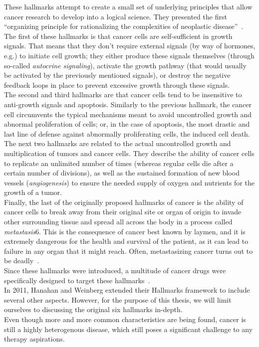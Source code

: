 These hallmarks attempt to create a small set of underlying principles that allow cancer research to develop into a logical science. They presented the first ``organizing principle for rationalizing the complexities of neoplastic disease''~\cite{hallmarks-of-cancer-next-generation}.\\
The first of these hallmarks is that cancer cells are self-sufficient in growth signals. That means that they don't require external signals (by way of hormones, e.g.) to initiate cell growth; they either produce these signals themselves (through so-called \textit{autocrine signaling}), activate the growth pathway (that would usually be activated by the previously mentioned signals), or destroy the negative feedback loops in place to prevent excessive growth through these signals.\\
The second and third hallmarks are that cancer cells tend to be insensitive to anti-growth signals and apoptosis. Similarly to the previous hallmark, the cancer cell circumvents the typical mechanisms meant to avoid uncontrolled growth and abnormal proliferation of cells; or, in the case of apoptosis, the most drastic and last line of defense against abnormally proliferating cells, the induced cell death.\\
The next two hallmarks are related to the actual uncontrolled growth and multiplication of tumors and cancer cells. They describe the ability of cancer cells to replicate an unlimited number of times (whereas regular cells die after a certain number of divisions), as well as the sustained formation of new blood vessels (\textit{angiogenesis}) to ensure the needed supply of oxygen and nutrients for the growth of a tumor.\\
Finally, the last of the originally proposed hallmarks of cancer is the ability of cancer cells to break away from their original site or organ of origin to invade other surrounding tissue and spread all across the body in a process called \textit{metastasis}6. This is the consequence of cancer best known by laymen, and it is extremely dangerous for the health and survival of the patient, as it can lead to failure in any organ that it might reach. Often, metastasizing cancer turns out to be deadly~\cite{metastatic_survival}.\\
Since these hallmarks were introduced, a multitude of cancer drugs were specifically designed to target these hallmarks~\cite{hallmarks_therapeutic_targeting, drug_development_hallmarks}.\\
In 2011, Hanahan and Weinberg extended their Hallmarks framework to include several other aspects. However, for the purpose of this thesis, we will limit ourselves to discussing the original six hallmarks in-depth.\\
Even though more and more common characteristics are being found, cancer is still a highly heterogenous disease, which still poses a significant challenge to any therapy aspirations.

